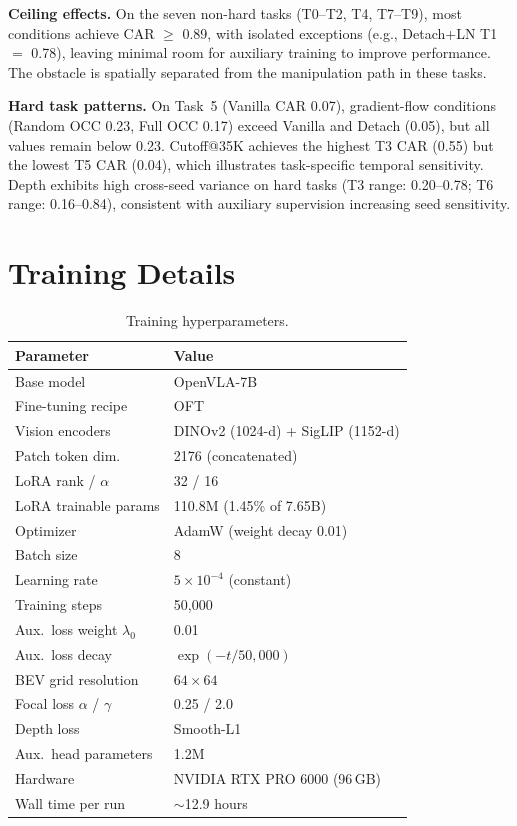 \textbf{Ceiling effects.} On the seven non-hard tasks (T0--T2, T4, T7--T9), most conditions achieve CAR $\geq$ 0.89, with isolated exceptions (e.g., Detach+LN T1 ${=}$ 0.78), leaving minimal room for auxiliary training to improve performance. The obstacle is spatially separated from the manipulation path in these tasks.

\textbf{Hard task patterns.} On Task~5 (Vanilla CAR 0.07), gradient-flow conditions (Random OCC 0.23, Full OCC 0.17) exceed Vanilla and Detach (0.05), but all values remain below 0.23. Cutoff@35K achieves the highest T3 CAR (0.55) but the lowest T5 CAR (0.04), which illustrates task-specific temporal sensitivity. Depth exhibits high cross-seed variance on hard tasks (T3 range: 0.20--0.78; T6 range: 0.16--0.84), consistent with auxiliary supervision increasing seed sensitivity.

\section{Training Details}
\label{app:training}

\begin{table}[h]
\centering
\caption{Training hyperparameters.}
\begin{tabular}{ll}
\toprule
Parameter & Value \\
\midrule
Base model & OpenVLA-7B~\cite{kim2024openvla} \\
Fine-tuning recipe & OFT~\cite{kim2025oft} \\
Vision encoders & DINOv2 (1024-d) + SigLIP (1152-d) \\
Patch token dim. & 2176 (concatenated) \\
LoRA rank / $\alpha$ & 32 / 16 \\
LoRA trainable params & 110.8M (1.45\% of 7.65B) \\
Optimizer & AdamW (weight decay 0.01) \\
Batch size & 8 \\
Learning rate & $5 \times 10^{-4}$ (constant) \\
Training steps & 50{,}000 \\
Aux.\ loss weight $\lambda_0$ & 0.01 \\
Aux.\ loss decay & $\exp(-t / 50{,}000)$ \\
BEV grid resolution & $64 \times 64$ \\
Focal loss $\alpha$ / $\gamma$ & 0.25 / 2.0 \\
Depth loss & Smooth-L1 \\
Aux.\ head parameters & 1.2M \\
Hardware & NVIDIA RTX PRO 6000 (96\,GB) \\
Wall time per run & $\sim$12.9 hours \\
\bottomrule
\end{tabular}
\end{table}

